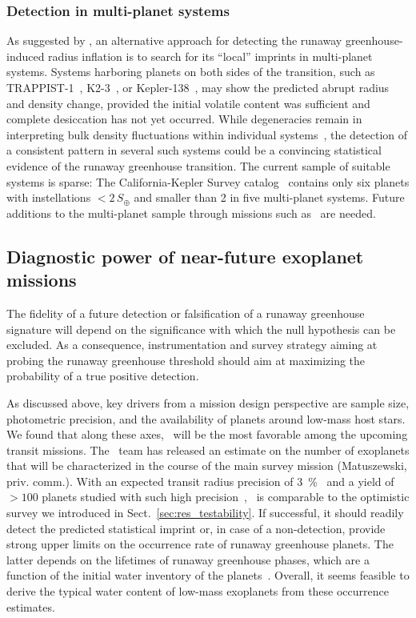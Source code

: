 \documentclass[twocolumn,twocolappendix]{aastex631}
\begin{document}
\subsubsection{Detection in multi-planet systems}
As suggested by \citet{Turbet2019}, an alternative approach for detecting the runaway greenhouse-induced radius inflation is to search for its ``local'' imprints in multi-planet systems.
Systems harboring planets on both sides of the transition, such as \mbox{TRAPPIST-1}~\citep{Gillon2016a,Gillon2017a,Luger2017c,Agol2021}, \mbox{K2-3}~\citep{2022AJ....164..172D}, or \mbox{Kepler-138}~\citep{2022NatAs.tmp..269P}, may show the predicted abrupt radius and density change, provided the initial volatile content was sufficient and complete desiccation has not yet occurred.
While degeneracies remain in interpreting bulk density fluctuations within individual systems~\citep[e.g.,][]{Turbet2020,Dorn2021}, the detection of a consistent pattern in several such systems could be a convincing statistical evidence of the runaway greenhouse transition.
The current sample of suitable systems is sparse: The California-Kepler Survey catalog~\citep{Fulton2018} contains only six planets with instellations $< 2\, S_\oplus$ and smaller than \SI{2}{\rEarth} in five multi-planet systems.
Future additions to the multi-planet sample through missions such as \plato\ are needed.

\subsection{Diagnostic power of near-future exoplanet missions}\label{sec:dis_samplesize}
The fidelity of a future detection or falsification of a runaway greenhouse signature will depend on the significance with which the null hypothesis can be excluded.
As a consequence, instrumentation and survey strategy aiming at probing the runaway greenhouse threshold should aim at maximizing the probability of a true positive detection.

As discussed above, key drivers from a mission design perspective are sample size, photometric precision, and the availability of planets around low-mass host stars.
We found that along these axes, \plato\ will be the most favorable among the upcoming transit missions.
The \plato\ team has released an estimate on the number of exoplanets that will be characterized in the course of the main survey mission (Matuszewski, priv. comm.).
With an expected transit radius precision of \SI{3}{\percent}~\citep{plato2017} and a yield of $> 100$ planets studied with such high precision~\citep{Rauer2021}, \plato\ is comparable to the optimistic survey we introduced in Sect.~\ref{sec:res_testability}.
If successful, it should readily detect the predicted statistical imprint or, in case of a non-detection, provide strong upper limits on the occurrence rate of runaway greenhouse planets.
The latter depends on the lifetimes of runaway greenhouse phases, which are a function of the initial water inventory of the planets~\citep{Hamano2015}.
Overall, it seems feasible to derive the typical water content of low-mass exoplanets from these occurrence estimates.
\end{document}
